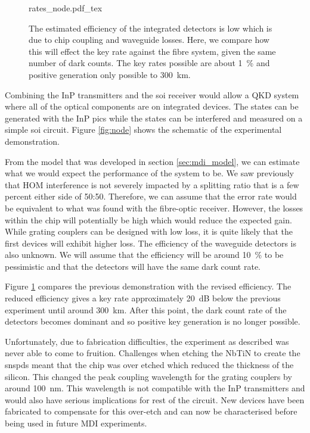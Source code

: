 \begin{figure}[t]
	\centering
	\small
	\def\svgwidth{0.8\textwidth} 
	{rates_node.pdf_tex}
	\caption[Estimated key rates for integrated SOI receiver]{The estimated efficiency of the integrated detectors is low which is due to chip coupling and waveguide losses. Here, we compare how this will effect the key rate against the fibre system, given the same number of dark counts. The key rates possible are about \SI{1}{\percent} and positive generation only possible to \SI{300}{\km}.}
	\label{fig:rates_node}
\end{figure}

Combining the \ac{InP} transmitters and the \ac{soi} receiver would allow a \ac{QKD} system where all of the optical components are on integrated devices. The states can be generated with the \ac{InP} \acp{pic} while the states can be interfered and measured on a simple \ac{soi} circuit. Figure \ref{fig:node} shows the schematic of the experimental demonstration.

From the model that was developed in section \ref{sec:mdi_model}, we can estimate what we would expect the performance of the system to be. We saw previously that \ac{HOM} interference is not severely impacted by a splitting ratio that is a few percent either side of 50:50. Therefore, we can assume that the error rate would be equivalent to what was found with the fibre-optic receiver. However, the losses within the chip will potentially be high which would reduce the expected gain. While grating couplers can be designed with low loss, it is quite likely that the first devices will exhibit higher loss. The efficiency of the waveguide detectors is also unknown. We will assume that the efficiency will be around \SI{10}{\percent} to be pessimistic and that the detectors will have the same dark count rate. 

Figure \ref{fig:rates_node} compares the previous demonstration with the revised efficiency. The reduced efficiency gives a key rate approximately \SI{20}{dB} below the previous experiment until around \SI{300}{km}. After this point, the dark count rate of the detectors becomes dominant and so positive key generation is no longer possible. 

Unfortunately, due to fabrication difficulties, the experiment as described was never able to come to fruition. Challenges when etching the \ac{NbTiN} to create the \acp{snspd} meant that the chip was over etched which reduced the thickness of the silicon. This changed the peak coupling wavelength for the grating couplers by around \SI{100}{nm}. This wavelength is not compatible with the \ac{InP} transmitters and would also have serious implications for rest of the circuit. New devices have been fabricated to compensate for this over-etch and can now be characterised before being used in future \ac{MDI} experiments.

